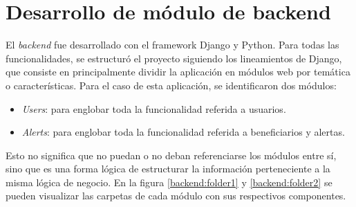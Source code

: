 \section{Desarrollo de módulo de backend}

El \textit{backend} fue desarrollado con el framework Django y Python. Para todas las funcionalidades, se estructuró el proyecto siguiendo los lineamientos de Django, que consiste en principalmente dividir la aplicación en módulos web por temática o características. Para el caso de esta aplicación, se identificaron dos módulos:
\begin{itemize}
	\item \textit{Users}: para englobar toda la funcionalidad referida a usuarios.
	\item \textit{Alerts}: para englobar toda la funcionalidad referida a beneficiarios y alertas.
\end{itemize}

Esto no significa que no puedan o no deban referenciarse los módulos entre sí, sino que es una forma lógica de estructurar la información perteneciente a la misma lógica de negocio. En la figura \ref{backend:folder1} y \ref{backend:folder2} se pueden visualizar las carpetas de cada módulo con sus respectivos componentes.

